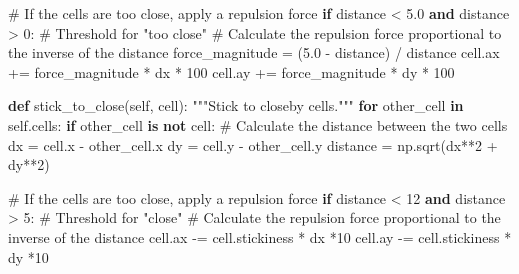 \documentclass[
  letterpaper,
  DIV=11,
  numbers=noendperiod]{scrreprt}
\newenvironment{Shaded}{\begin{snugshade}}{\end{snugshade}}
\newcommand{\CommentTok}[1]{\textcolor[rgb]{0.37,0.37,0.37}{#1}}
\newcommand{\ControlFlowTok}[1]{\textcolor[rgb]{0.00,0.23,0.31}{\textbf{#1}}}
\newcommand{\DecValTok}[1]{\textcolor[rgb]{0.68,0.00,0.00}{#1}}
\newcommand{\FloatTok}[1]{\textcolor[rgb]{0.68,0.00,0.00}{#1}}
\newcommand{\KeywordTok}[1]{\textcolor[rgb]{0.00,0.23,0.31}{\textbf{#1}}}
\newcommand{\NormalTok}[1]{\textcolor[rgb]{0.00,0.23,0.31}{#1}}
\newcommand{\OperatorTok}[1]{\textcolor[rgb]{0.37,0.37,0.37}{#1}}
\newcommand{\VariableTok}[1]{\textcolor[rgb]{0.07,0.07,0.07}{#1}}
\theoremstyle{definition}
\theoremstyle{remark}
\begin{document}
\begin{tcolorbox}
\begin{Shaded}
\begin{Highlighting}[]
                \CommentTok{\# If the cells are too close, apply a repulsion force}
                \ControlFlowTok{if}\NormalTok{ distance }\OperatorTok{\textless{}} \FloatTok{5.0} \KeywordTok{and}\NormalTok{ distance }\OperatorTok{\textgreater{}} \DecValTok{0}\NormalTok{:  }\CommentTok{\# Threshold for "too close"}
                    \CommentTok{\# Calculate the repulsion force proportional to the inverse of the distance}
\NormalTok{                    force\_magnitude }\OperatorTok{=}\NormalTok{ (}\FloatTok{5.0} \OperatorTok{{-}}\NormalTok{ distance) }\OperatorTok{/}\NormalTok{ distance}
\NormalTok{                    cell.ax }\OperatorTok{+=}\NormalTok{ force\_magnitude }\OperatorTok{*}\NormalTok{ dx  }\OperatorTok{*} \DecValTok{100}
\NormalTok{                    cell.ay }\OperatorTok{+=}\NormalTok{ force\_magnitude }\OperatorTok{*}\NormalTok{ dy }\OperatorTok{*} \DecValTok{100}
                    
    \KeywordTok{def}\NormalTok{ stick\_to\_close(}\VariableTok{self}\NormalTok{, cell):}
        \CommentTok{"""Stick to closeby cells."""}
        \ControlFlowTok{for}\NormalTok{ other\_cell }\KeywordTok{in} \VariableTok{self}\NormalTok{.cells:}
            \ControlFlowTok{if}\NormalTok{ other\_cell }\KeywordTok{is} \KeywordTok{not}\NormalTok{ cell:}
                \CommentTok{\# Calculate the distance between the two cells}
\NormalTok{                dx }\OperatorTok{=}\NormalTok{ cell.x }\OperatorTok{{-}}\NormalTok{ other\_cell.x}
\NormalTok{                dy }\OperatorTok{=}\NormalTok{ cell.y }\OperatorTok{{-}}\NormalTok{ other\_cell.y}
\NormalTok{                distance }\OperatorTok{=}\NormalTok{ np.sqrt(dx}\OperatorTok{**}\DecValTok{2} \OperatorTok{+}\NormalTok{ dy}\OperatorTok{**}\DecValTok{2}\NormalTok{)}

                \CommentTok{\# If the cells are too close, apply a repulsion force}
                \ControlFlowTok{if}\NormalTok{ distance }\OperatorTok{\textless{}} \DecValTok{12} \KeywordTok{and}\NormalTok{ distance }\OperatorTok{\textgreater{}} \DecValTok{5}\NormalTok{:  }\CommentTok{\# Threshold for "close"}
                    \CommentTok{\# Calculate the repulsion force proportional to the inverse of the distance}
\NormalTok{                    cell.ax }\OperatorTok{{-}=}\NormalTok{ cell.stickiness }\OperatorTok{*}\NormalTok{ dx }\OperatorTok{*}\DecValTok{10}
\NormalTok{                    cell.ay }\OperatorTok{{-}=}\NormalTok{ cell.stickiness }\OperatorTok{*}\NormalTok{ dy }\OperatorTok{*}\DecValTok{10}
    

\end{Highlighting}
\end{Shaded}
\end{tcolorbox}
\end{document}
